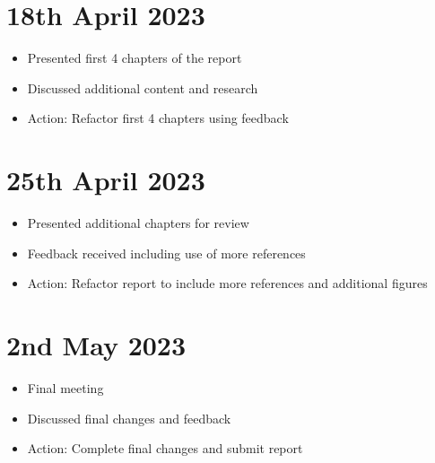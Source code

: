 \section{18th April 2023}
\begin{itemize}
    \item Presented first 4 chapters of the report
    \item Discussed additional content and research
    \item Action: Refactor first 4 chapters using feedback
\end{itemize}

\section{25th April 2023}
\begin{itemize}
    \item Presented additional chapters for review
    \item Feedback received including use of more references
    \item Action: Refactor report to include more references and additional figures
\end{itemize}

\section{2nd May 2023}
\begin{itemize}
    \item Final meeting
    \item Discussed final changes and feedback
    \item Action: Complete final changes and submit report
\end{itemize}

